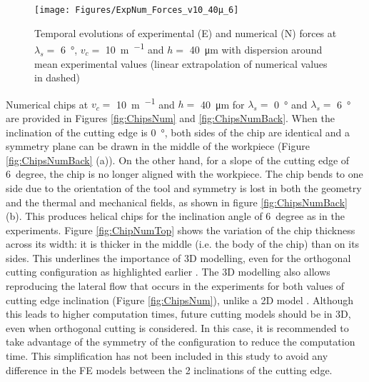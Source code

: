 \documentclass[preprint,12pt,times]{elsarticle}
\begin{document}
\begin{figure}[!h]
\centering
\texttt{[image: Figures/ExpNum\_Forces\_v10\_40µ\_6]}
\caption{Temporal evolutions of experimental (E) and numerical (N) forces at $\lambda_s =$ \qty{6}{\degree}, $v_c =$ \qty{10}{\m\per\min} and $h =$ \qty{40}{\um} with dispersion around mean experimental values (linear extrapolation of numerical values in dashed)}
\label{fig:ExpNum_Forces_v10_40µ_6}
\end{figure}

Numerical chips at $v_c =$ \qty{10}{\m\per\min} and $h =$ \qty{40}{\um} for $\lambda_s =$ \qty{0}{\degree} and $\lambda_s =$ \qty{6}{\degree} are provided in Figures \ref{fig:ChipsNum} and \ref{fig:ChipsNumBack}. When the inclination of the cutting edge is \qty{0}{\degree}, both sides of the chip are identical and a symmetry plane can be drawn in the middle of the workpiece (Figure \ref{fig:ChipsNumBack} (a)). On the other hand, for a slope of the cutting edge of \qty{6}{degree}, the chip is no longer aligned with the workpiece. The chip bends to one side due to the orientation of the tool and symmetry is lost in both the geometry and the thermal and mechanical fields, as shown in figure \ref{fig:ChipsNumBack} (b). This produces helical chips for the inclination angle of \qty{6}{degree} as in the experiments. Figure \ref{fig:ChipNumTop} shows the variation of the chip thickness across its width: it is thicker in the middle (i.e. the body of the chip) than on its sides. This underlines the importance of 3D modelling, even for the orthogonal cutting configuration as highlighted earlier \cite{ducobu_Finite_2017}. The 3D modelling also allows reproducing the lateral flow that occurs in the experiments for both values of cutting edge inclination (Figure \ref{fig:ChipsNum}), unlike a 2D model \cite{xu_Simulation_2021, ambrosio_New_2022, ducobu_Finite_2017}. Although this leads to higher computation times, future cutting models should be in 3D, even when orthogonal cutting is considered. In this case, it is recommended to take advantage of the symmetry of the configuration to reduce the computation time. This simplification has not been included in this study to avoid any difference in the FE models between the 2 inclinations of the cutting edge.
\end{document}
